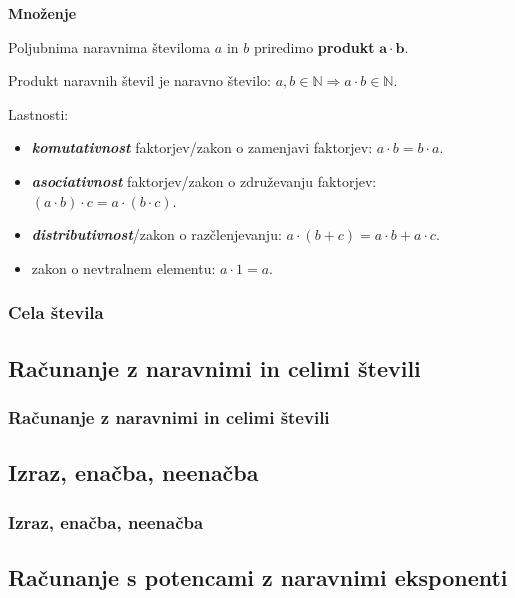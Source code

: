        \begin{frame}
            \textbf{\large{Množenje}}
            
            \bigskip
            Poljubnima naravnima številoma $a$ in $b$ priredimo \textbf{produkt} $\mathbf{a\cdot b}$.
            
            \bigskip
            Produkt naravnih števil je naravno število: $a, b \in \mathbb{N} \Rightarrow a \cdot b \in \mathbb{N}$.            

            \bigskip
            Lastnosti:
            \begin{itemize}
                \item \textit{\textbf{komutativnost}} faktorjev/zakon o zamenjavi faktorjev: $a \cdot b = b \cdot a$.
                \item \textit{\textbf{asociativnost}} faktorjev/zakon o združevanju faktorjev: $(a \cdot b) \cdot c = a \cdot (b \cdot c)$.
                \item \textit{\textbf{distributivnost}}/zakon o razčlenjevanju: $a \cdot (b+c) = a \cdot b + a \cdot c$.
                \item zakon o nevtralnem elementu: $a \cdot 1 = a$.
            \end{itemize}

        \end{frame}

        \begin{frame}
            \frametitle{Cela števila}
        \end{frame}

    \subsection{Računanje z naravnimi in celimi števili}

        \begin{frame}
            \frametitle{Računanje z naravnimi in celimi števili}
        \end{frame}

    \subsection{Izraz, enačba, neenačba}

        \begin{frame}
            \frametitle{Izraz, enačba, neenačba}
        \end{frame}

    \subsection{Računanje s potencami z naravnimi eksponenti}

